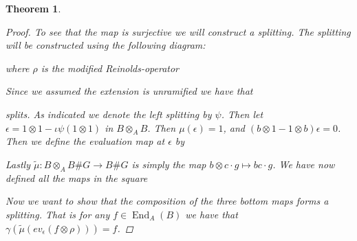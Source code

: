 \documentclass[11pt, a4paper, english]{article}
\newtheorem{theorem}{Theorem}[section]
\theoremstyle{definition}
\DeclareMathOperator{\Hom}{Hom}
\DeclareMathOperator{\End}{End}
\begin{document}
\begin{theorem}
\begin{proof}
To see that the map is surjective we will construct a splitting. The splitting will be constructed using the following diagram:
\begin{center}
\end{center}
where $\rho$ is the modified Reinolds-operator
\begin{center}
\end{center}
Since we assumed the extension is unramified we have that
\begin{center}
\end{center}
splits. As indicated we denote the left splitting by $\psi$. Then let $\epsilon = 1 \otimes 1 - \iota\psi(1 \otimes 1)$ in $B \otimes_A B$. Then $\mu(\epsilon) = 1$, and $(b \otimes 1 - 1 \otimes b)\epsilon = 0$. Then we define the evaluation map at $\epsilon$ by
\begin{center}
\end{center}
Lastly $\tilde{\mu}: B \otimes_A B\#G \to B\#G$ is simply the map $b \otimes c \cdot g \mapsto bc \cdot g$. We have now defined all the maps in the square
\begin{center}
\end{center}
Now we want to show that the composition of the three bottom maps forms a splitting. That is for any $f \in \End_A(B)$ we have that $\gamma(\tilde{\mu}(ev_\epsilon(f \otimes \rho))) = f$.


\end{proof}
\end{theorem}
\end{document}
